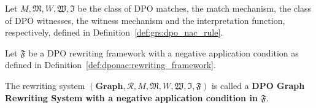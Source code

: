 \documentclass{book}
\begin{document}

    \begin{definition}
      Let $M, \mathfrak{M}, W, \mathfrak{W}, \mathfrak{I}$ be the class of DPO matches, the match mechanism, the class of DPO witnesses, the witness mechanism and the interpretation function, respectively, defined in Definition~\ref{def:grs:dpo_nac_rule}.

      Let $\mathfrak{F}$ be a DPO rewriting framework with a negative application condition as defined in Definition~\ref{def:dponac:rewriting_framework}.

      The rewriting system $(\mathbf{Graph}, \mathcal{R}, M, \mathfrak{M}, W, \mathfrak{W}, \mathfrak{I}, \mathfrak{F})$ is called a \textbf{DPO Graph Rewriting System with a negative application condition in $\mathfrak{F}$}.
    \end{definition}
    
\end{document}
